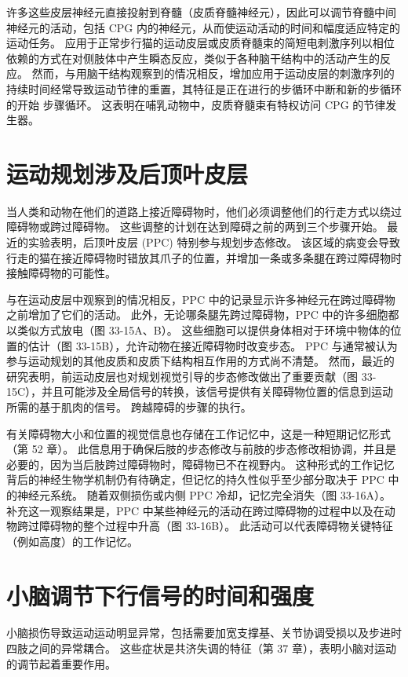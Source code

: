 许多这些皮层神经元直接投射到脊髓（皮质脊髓神经元），因此可以调节脊髓中间神经元的活动，包括 CPG 内的神经元，从而使运动活动的时间和幅度适应特定的运动任务。 应用于正常步行猫的运动皮层或皮质脊髓束的简短电刺激序列以相位依赖的方式在对侧肢体中产生瞬态反应，类似于各种脑干结构中的活动产生的反应。 然而，与用脑干结构观察到的情况相反，增加应用于运动皮层的刺激序列的持续时间经常导致运动节律的重置，其特征是正在进行的步循环中断和新的步循环的开始 步骤循环。 这表明在哺乳动物中，皮质脊髓束有特权访问 CPG 的节律发生器。

\section{运动规划涉及后顶叶皮层}
当人类和动物在他们的道路上接近障碍物时，他们必须调整他们的行走方式以绕过障碍物或跨过障碍物。 这些调整的计划在达到障碍之前的两到三个步骤开始。 最近的实验表明，后顶叶皮层 (PPC) 特别参与规划步态修改。 该区域的病变会导致行走的猫在接近障碍物时错放其爪子的位置，并增加一条或多条腿在跨过障碍物时接触障碍物的可能性。

与在运动皮层中观察到的情况相反，PPC 中的记录显示许多神经元在跨过障碍物之前增加了它们的活动。 此外，无论哪条腿先跨过障碍物，PPC 中的许多细胞都以类似方式放电（图 33-15A、B）。 这些细胞可以提供身体相对于环境中物体的位置的估计（图 33-15B），允许动物在接近障碍物时改变步态。 PPC 与通常被认为参与运动规划的其他皮质和皮质下结构相互作用的方式尚不清楚。 然而，最近的研究表明，前运动皮层也对规划视觉引导的步态修改做出了重要贡献（图 33-15C），并且可能涉及全局信号的转换，该信号提供有关障碍物位置的信息到运动所需的基于肌肉的信号。 跨越障碍的步骤的执行。

有关障碍物大小和位置的视觉信息也存储在工作记忆中，这是一种短期记忆形式（第 52 章）。 此信息用于确保后肢的步态修改与前肢的步态修改相协调，并且是必要的，因为当后肢跨过障碍物时，障碍物已不在视野内。 这种形式的工作记忆背后的神经生物学机制仍有待确定，但记忆的持久性似乎至少部分取决于 PPC 中的神经元系统。 随着双侧损伤或内侧 PPC 冷却，记忆完全消失（图 33-16A）。 补充这一观察结果是，PPC 中某些神经元的活动在跨过障碍物的过程中以及在动物跨过障碍物的整个过程中升高（图 33-16B）。 此活动可以代表障碍物关键特征（例如高度）的工作记忆。


\section{小脑调节下行信号的时间和强度}

小脑损伤导致运动运动明显异常，包括需要加宽支撑基、关节协调受损以及步进时四肢之间的异常耦合。 这些症状是共济失调的特征（第 37 章），表明小脑对运动的调节起着重要作用。

